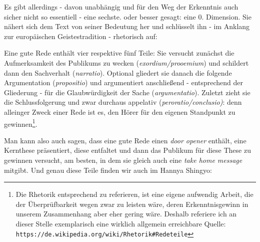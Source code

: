 \documentclass[
DIV=calc,
BCOR=5mm,
11pt,
headings=small,
oneside,
bibtotocnumbered]{scrartcl}
\begin{document}
Es gibt allerdings - davon unabhängig und für den Weg der Erkenntnis auch sicher
nicht so essentiell - eine sechste. oder besser gesagt: eine 0. Dimension. Sie
nähert sich dem Text von seiner Bedeutung her  und schlüsselt ihn - im Anklang
zur europäischen Geistestradition - rhetorisch auf:

Eine gute Rede enthält vier respektive fünf Teile: Sie versucht zunächst die
Aufmerksamkeit des Publikums zu wecken (\emph{exordium/prooemium}) und schildert
dann den Sachverhalt (\emph{narratio}). Optional gliedert sie danach die
folgende Argumentation (\emph{propositio}) und argumentiert anschließend -
entsprechend der Gliederung - für die Glaubwürdigkeit der Sache
(\emph{argumentatio}). Zuletzt zieht sie die Schlussfolgerung und zwar durchaus
appelativ (\emph{peroratio/conclusio)}: denn alleinger Zweck einer Rede ist es,
den Hörer für den eigenen Standpunkt zu gewinnen\footnote{Die Rhetorik
entsprechend zu referieren, ist eine eigene aufwendig Arbeit, die der
Überprüfbarkeit wegen zwar zu leisten wäre, deren Erkenntnisgewinn in unserem
Zusammenhang aber eher gering wäre. Deshalb referiere ich an dieser Stelle
exemplarisch eine wirklich allgemein erreichbare Quelle:
\texttt{https://de.wikipedia.org/wiki/Rhetorik\#Redeteile} }.

Man kann also auch sagen, dass eine gute Rede einen \emph{door opener} enthält,
eine Kernthese präsentiert, diese entfaltet und dann das Publikum für diese
These zu gewinnen versucht, am besten, in dem sie gleich auch eine \emph{take
home message} mitgibt. Und genau diese Teile finden wir auch im Hannya Shingyo:



\end{document}
